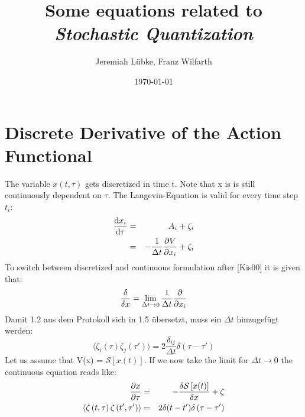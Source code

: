 \documentclass[11pt,a4paper]{scrartcl}
\title{Some equations related to \emph{Stochastic Quantization}}
\author{Jeremiah Lübke, Franz Wilfarth}
\date{\today}
\newcommand{\SD}{\ensuremath{\mathcal{S}_{\mathrm{D}}}}
\newcommand{\xdoti}{\ensuremath{\dot{x}_i}}
\newcommand{\OverDeltaT}[1]{\ensuremath{\frac{#1}{\Delta t}}}
\newcommand{\OverTwoDeltaT}[1]{\ensuremath{\frac{#1}{2\, \Delta t}}}
\begin{document}
\maketitle

\section*{Discrete Derivative of the Action Functional}
The variable $x(t,\tau)$ gets discretized in time t. Note that x is is still continuously dependent on $\tau$.
The Langevin-Equation is valid for every time step $t_i$:
\begin{eqnarray*}
    \dv{x_i}{\tau} &=& A_i + \zeta_i\\
                &=& - \frac{1}{\Delta t} \pdv{V}{x_i} + \zeta_i
\end{eqnarray*}
To switch between discretized and continuous formulation after [Kis00] it is given that:
\begin{equation*}
    \frac{\delta}{\delta x} = \lim\limits_{\Delta t \to 0} \OverDeltaT{1} \pdv{}{x_i}
\end{equation*}
Damit 1.2 aus dem Protokoll sich in 1.5 übersetzt, muss ein $\Delta t$ hinzugefügt werden:
\begin{equation*}
    \langle \zeta_i \left(\tau \right) \zeta_j \left( \tau' \right) \rangle = 2 \frac{\delta_{ij}}{\Delta t} \delta\left( \tau - \tau' \right)
\end{equation*}
Let us assume that V(x) = $\mathcal{S}\left[x(t)\right]$.
If we now take the limit for $\Delta t \rightarrow 0$ the continuous equation reads like:
\begin{eqnarray*}
    \pdv{x}{\tau} &=& - \frac{\delta \mathcal{S}\left[x(t)\right]}{\delta x}  + \zeta\\
    \langle \zeta \left(t,\tau \right) \zeta \left( t',\tau' \right) \rangle &=& 2 \delta(t - t') \delta\left( \tau - \tau' \right)
\end{eqnarray*}

\end{document}
